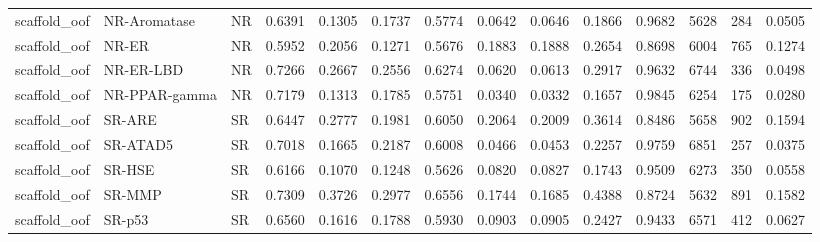 \begin{tabular}{llllllllllllll}
scaffold\_oof & NR-Aromatase & NR & 0.6391 & 0.1305 & 0.1737 & 0.5774 & 0.0642 & 0.0646 & 0.1866 & 0.9682 & 5628 & 284 & 0.0505 \\
scaffold\_oof & NR-ER & NR & 0.5952 & 0.2056 & 0.1271 & 0.5676 & 0.1883 & 0.1888 & 0.2654 & 0.8698 & 6004 & 765 & 0.1274 \\
scaffold\_oof & NR-ER-LBD & NR & 0.7266 & 0.2667 & 0.2556 & 0.6274 & 0.0620 & 0.0613 & 0.2917 & 0.9632 & 6744 & 336 & 0.0498 \\
scaffold\_oof & NR-PPAR-gamma & NR & 0.7179 & 0.1313 & 0.1785 & 0.5751 & 0.0340 & 0.0332 & 0.1657 & 0.9845 & 6254 & 175 & 0.0280 \\
scaffold\_oof & SR-ARE & SR & 0.6447 & 0.2777 & 0.1981 & 0.6050 & 0.2064 & 0.2009 & 0.3614 & 0.8486 & 5658 & 902 & 0.1594 \\
scaffold\_oof & SR-ATAD5 & SR & 0.7018 & 0.1665 & 0.2187 & 0.6008 & 0.0466 & 0.0453 & 0.2257 & 0.9759 & 6851 & 257 & 0.0375 \\
scaffold\_oof & SR-HSE & SR & 0.6166 & 0.1070 & 0.1248 & 0.5626 & 0.0820 & 0.0827 & 0.1743 & 0.9509 & 6273 & 350 & 0.0558 \\
scaffold\_oof & SR-MMP & SR & 0.7309 & 0.3726 & 0.2977 & 0.6556 & 0.1744 & 0.1685 & 0.4388 & 0.8724 & 5632 & 891 & 0.1582 \\
scaffold\_oof & SR-p53 & SR & 0.6560 & 0.1616 & 0.1788 & 0.5930 & 0.0903 & 0.0905 & 0.2427 & 0.9433 & 6571 & 412 & 0.0627 \\
\hline
\end{tabular}
